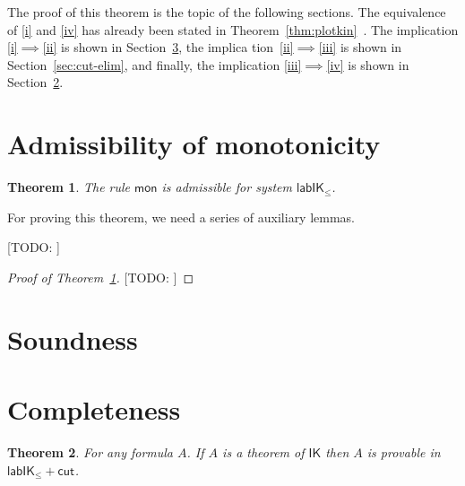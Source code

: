 \documentclass[a4paper]{article}
\theoremstyle{plain}
\newtheorem{theorem}{Theorem}[section]
\theoremstyle{definition}
\newcommand{\todo}[1]{{\color{red}[TODO: #1]}}
\newcommand*{\lab}{\mathsf{lab}}
\newcommand*{\IK}{\mathsf{IK}}
\newcommand*{\labIKp}{\lab\IK_{\le}}
\newcommand*{\rn}[1]  {\ensuremath{\mathsf{#1}}}
\newcommand*{\labrn}[2][]  {\rn{#2}_{#1}}%
\begin{document}
The proof of this theorem is the topic of the following sections. The
equivalence of \ref{i} and \ref{iv} has already been stated in
Theorem~\ref{thm:plotkin}~\cite{fischer-servi:84, plotkin:stirling:86}. The implication
\ref{i}$\implies$\ref{ii} is shown in Section~\ref{sec:completeness},
the implica tion~\ref{ii}$\implies$\ref{iii} is shown in
Section~\ref{sec:cut-elim}, and finally, the implication
\ref{iii}$\implies$\ref{iv} is shown in Section~\ref{sec:soundness}.


\section{Admissibility of monotonicity}\label{sec:mon}

\begin{theorem}
	\label{thm:mon-adm}
	The rule $\rn{mon}$ is admissible for system $\labIKp$.
\end{theorem}

For proving this theorem, we need a series of auxiliary lemmas.

\todo{}

\begin{proof}[Proof of Theorem~\ref{thm:mon-adm}]
	\todo{}
\end{proof}


\section{Soundness}\label{sec:soundness}


\section{Completeness}\label{sec:completeness}

\begin{theorem}
	For any formula $A$. If $A$ is a theorem of $\IK$ then $A$ is provable in $\labIKp +\labrn{cut}$.
\end{theorem}
\end{document}
